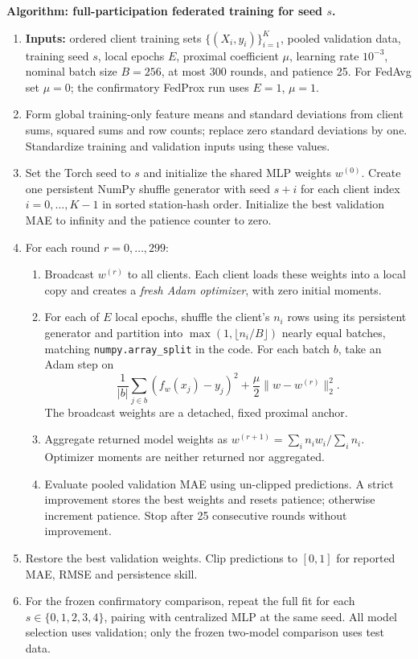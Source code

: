 \noindent\textbf{Algorithm: full-participation federated training for seed $s$.}
\begin{enumerate}
\item \textbf{Inputs:} ordered client training sets $\{(X_i,y_i)\}_{i=1}^K$,
pooled validation data, training seed $s$, local epochs $E$, proximal
coefficient $\mu$, learning rate $10^{-3}$, nominal batch size $B=256$,
at most 300 rounds, and patience 25.
For FedAvg set $\mu=0$; the confirmatory FedProx run uses $E=1$, $\mu=1$.
\item Form global training-only feature means and standard deviations from
client sums, squared sums and row counts; replace zero standard deviations
by one. Standardize training and validation inputs using these values.
\item Set the Torch seed to $s$ and initialize the shared MLP weights
$w^{(0)}$. Create one persistent NumPy shuffle generator with seed $s+i$
for each client index $i=0,\ldots,K-1$ in sorted station-hash order.
Initialize the best validation MAE to infinity and the patience counter to zero.
\item For each round $r=0,\ldots,299$:
\begin{enumerate}
\item Broadcast $w^{(r)}$ to all clients. Each client loads these weights into
a local copy and creates a \emph{fresh Adam optimizer}, with zero initial moments.
\item For each of $E$ local epochs, shuffle the client's $n_i$ rows using its
persistent generator and partition into $\max(1,\lfloor n_i/B\rfloor)$
nearly equal batches, matching \texttt{numpy.array\_split} in the code.
For each batch $b$, take an Adam step on
\[
\frac{1}{|b|}\sum_{j\in b}(f_w(x_j)-y_j)^2
+\frac{\mu}{2}\lVert w-w^{(r)}\rVert_2^2.
\]
The broadcast weights are a detached, fixed proximal anchor.
\item Aggregate returned model weights as
$w^{(r+1)}=\sum_i n_i w_i/\sum_i n_i$.
Optimizer moments are neither returned nor aggregated.
\item Evaluate pooled validation MAE using un-clipped predictions. A strict
improvement stores the best weights and resets patience; otherwise increment
patience. Stop after 25 consecutive rounds without improvement.
\end{enumerate}
\item Restore the best validation weights. Clip predictions to $[0,1]$ for
reported MAE, RMSE and persistence skill.
\item For the frozen confirmatory comparison, repeat the full fit for each
$s\in\{0,1,2,3,4\}$, pairing with centralized MLP at the same seed. All model
selection uses validation; only the frozen two-model comparison uses test data.
\end{enumerate}
